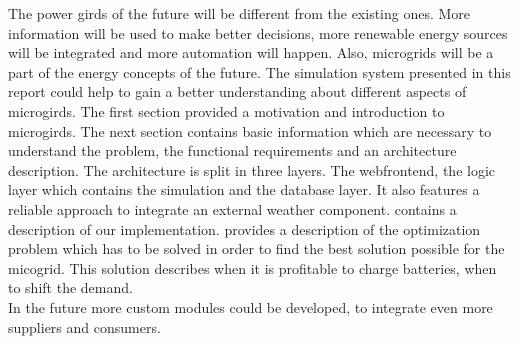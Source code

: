 The power girds of the future will be different from the existing ones. More information will be used to make better decisions, more renewable energy sources will be integrated and more automation will happen. Also, microgrids will be a part of the energy concepts of the future. The simulation system presented in this report could help to gain a better understanding about different aspects of microgirds. The first section provided a motivation and introduction to microgirds. The next section contains basic information which are necessary to understand the problem, the functional requirements and an architecture description. The architecture is split in three layers. The webfrontend, the logic layer which contains the simulation and the database layer. It also features a reliable approach to integrate an external weather component.  contains a description of our implementation.  provides a description of the optimization problem which has to be solved in order to find the best solution possible for the micogrid. This solution describes when it is profitable to charge batteries, when to shift the demand.\\

\noindent In the future more custom modules could be developed, to integrate even more suppliers and consumers.
